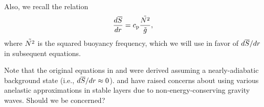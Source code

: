 \documentclass[12pt]{article}
\numberwithin{equation}{section}
\begin{document}
	
	Also, we recall the relation
	\begin{align}
		\frac{d\overline{S}}{dr} = c_{\rm{p}} \frac{\tilde{N^2}}{\tilde{g}},
	\end{align}
	where $\tilde{N^2}$ is the squared buoyancy frequency, which we will use in favor of $d\overline{S}/dr$ in subsequent equations. 
	
	Note that the original equations in \citet{Gilman1981} and \citet{Clune1999} were derived assuming a nearly-adiabatic background state (i.e., $d\overline{S}/dr\approx0$). \citet{Brown2012} and \citet{Vasil2013} have raised concerns about using various anelastic approximations in stable layers due to non-energy-conserving gravity waves. Should we be concerned?
	
\end{document}
